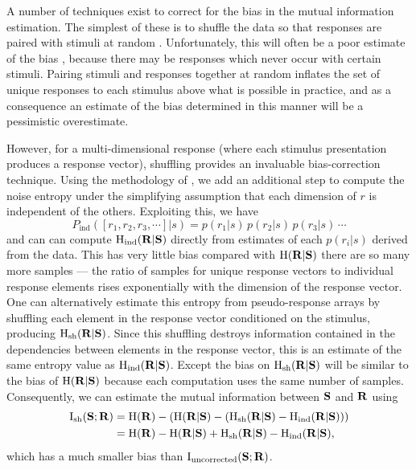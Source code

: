 A number of techniques exist to correct for the bias in the mutual information estimation.
The simplest of these is to shuffle the data so that responses are paired with stimuli at random \citep{Optican1991}.
Unfortunately, this will often be a poor estimate of the bias \citep{Panzeri1996}, because there may be responses which never occur with certain stimuli.
Pairing stimuli and responses together at random inflates the set of unique responses to each stimulus above what is possible in practice, and as a consequence an estimate of the bias determined in this manner will be a pessimistic overestimate.

However, for a multi-dimensional response (where each stimulus presentation produces a response vector), shuffling provides an invaluable bias-correction technique.
Using the methodology of \citet{Montemurro2007}, we add an additional step to compute the noise entropy under the simplifying assumption that each dimension of $r$ is independent of the others.
Exploiting this, we have
\begin{equation}
P_\text{ind}([r_1,r_2,r_3,\cdots]|s) = p(r_1|s)\,p(r_2|s)\,p(r_3|s)\,\cdots
\end{equation}
and can can compute $\operatorname{H}_\text{ind}( \mathbf{R} | \mathbf{S} )$ directly from estimates of each $p(r_i|s)$ derived from the data.
This has very little bias compared with $\operatorname{H}( \mathbf{R} | \mathbf{S} )$ there are so many more samples --- the ratio of samples for unique response vectors to individual response elements rises exponentially with the dimension of the response vector.
One can alternatively estimate this entropy from pseudo-response arrays by shuffling each element in the response vector conditioned on the stimulus, producing $\operatorname{H}_\text{sh}( \mathbf{R} | \mathbf{S} )$.
Since this shuffling destroys information contained in the dependencies between elements in the response vector, this is an estimate of the same entropy value as $\operatorname{H}_\text{ind}( \mathbf{R} | \mathbf{S} )$.
Except the bias on $\operatorname{H}_\text{sh}( \mathbf{R} | \mathbf{S} )$ will be similar to the bias of $\operatorname{H}( \mathbf{R} | \mathbf{S} )$ because each computation uses the same number of samples.
Consequently, we can estimate the mutual information between $\mathbf{S}$ and $\mathbf{R}$ using
\begin{align}
\operatorname{I}_{\text{sh}}(\mathbf{S};\mathbf{R})
   &= \operatorname{H}( \mathbf{R} ) - \left( \operatorname{H}( \mathbf{R} | \mathbf{S} ) - \left( \operatorname{H}_\text{sh}( \mathbf{R} | \mathbf{S} ) - \operatorname{H}_\text{ind}( \mathbf{R} | \mathbf{S} ) \right) \right) \notag
\\ &= \operatorname{H}( \mathbf{R} ) - \operatorname{H}( \mathbf{R} | \mathbf{S} ) + \operatorname{H}_\text{sh}( \mathbf{R} | \mathbf{S} ) - \operatorname{H}_\text{ind}( \mathbf{R} | \mathbf{S} )
,\end{align}
which has a much smaller bias than $\operatorname{I}_{\text{uncorrected}}(\mathbf{S};\mathbf{R})$.

